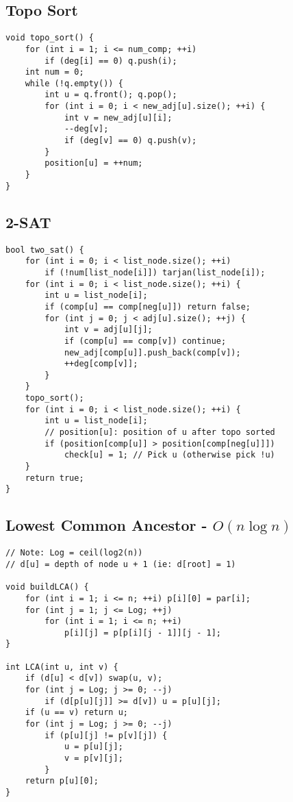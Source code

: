 \documentclass[10pt,landscape]{article}
\begin{document}
\begin{multicols}{2}
\subsection{Topo Sort}
\begin{lstlisting}
void topo_sort() {
    for (int i = 1; i <= num_comp; ++i)
        if (deg[i] == 0) q.push(i);
    int num = 0;
    while (!q.empty()) {
        int u = q.front(); q.pop();
        for (int i = 0; i < new_adj[u].size(); ++i) {
            int v = new_adj[u][i];
            --deg[v];
            if (deg[v] == 0) q.push(v);
        }
        position[u] = ++num;
    }
}
\end{lstlisting}
\subsection{2-SAT}
\begin{lstlisting}
bool two_sat() {
    for (int i = 0; i < list_node.size(); ++i)
        if (!num[list_node[i]]) tarjan(list_node[i]);
    for (int i = 0; i < list_node.size(); ++i) {
        int u = list_node[i];
        if (comp[u] == comp[neg[u]]) return false;
        for (int j = 0; j < adj[u].size(); ++j) {
            int v = adj[u][j];
            if (comp[u] == comp[v]) continue;
            new_adj[comp[u]].push_back(comp[v]);
            ++deg[comp[v]];
        }
    }
    topo_sort();
    for (int i = 0; i < list_node.size(); ++i) {
        int u = list_node[i];
        // position[u]: position of u after topo sorted
        if (position[comp[u]] > position[comp[neg[u]]])
            check[u] = 1; // Pick u (otherwise pick !u)
    }
    return true;
}
\end{lstlisting}
\subsection{Lowest Common Ancestor - $O(n\log n)$}
\begin{lstlisting}
// Note: Log = ceil(log2(n))
// d[u] = depth of node u + 1 (ie: d[root] = 1)

void buildLCA() {
    for (int i = 1; i <= n; ++i) p[i][0] = par[i];
    for (int j = 1; j <= Log; ++j)
        for (int i = 1; i <= n; ++i)
            p[i][j] = p[p[i][j - 1]][j - 1];
}

int LCA(int u, int v) {
    if (d[u] < d[v]) swap(u, v);
    for (int j = Log; j >= 0; --j)
        if (d[p[u][j]] >= d[v]) u = p[u][j];
    if (u == v) return u;
    for (int j = Log; j >= 0; --j)
        if (p[u][j] != p[v][j]) {
            u = p[u][j];
            v = p[v][j];
        }
    return p[u][0];
}
\end{lstlisting}

\end{multicols}
\end{document}
